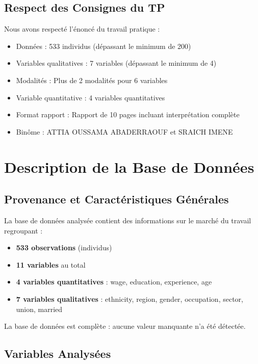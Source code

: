 \documentclass[12pt,a4paper]{report}
\begin{document}
\subsection{Respect des Consignes du TP}

Nous avons respecté l'énoncé du travail pratique :
\begin{itemize}
    \item Données : 533 individus (dépassant le minimum de 200)
    \item Variables qualitatives : 7 variables (dépassant le minimum de 4)
    \item Modalités : Plus de 2 modalités pour 6 variables
    \item Variable quantitative : 4 variables quantitatives
    \item Format rapport : Rapport de 10 pages incluant interprétation complète
    \item Binôme : ATTIA OUSSAMA ABADERRAOUF et SRAICH IMENE
\end{itemize}

\section{Description de la Base de Données}

\subsection{Provenance et Caractéristiques Générales}

La base de données analysée contient des informations sur le marché du travail regroupant :
\begin{itemize}
    \item \textbf{533 observations} (individus)
    \item \textbf{11 variables} au total
    \item \textbf{4 variables quantitatives} : wage, education, experience, age
    \item \textbf{7 variables qualitatives} : ethnicity, region, gender, occupation, sector, union, married
\end{itemize}

La base de données est complète : aucune valeur manquante n'a été détectée.

\subsection{Variables Analysées}
\end{document}
